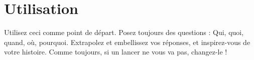 \documentclass{article}
\begin{document}
\title{\vspace{-1cm}{\Huge One-Roll PNJs} \vspace{-1cm}}

\date{}

\maketitle

\section*{Utilisation}
Utilisez ceci comme point de départ. Posez toujours des questions : Qui, quoi, quand, où, pourquoi. Extrapolez et embellissez vos réponses, et inspirez-vous de votre histoire. Comme toujours, si un lancer ne vous va pas, changez-le !
\end{document}

